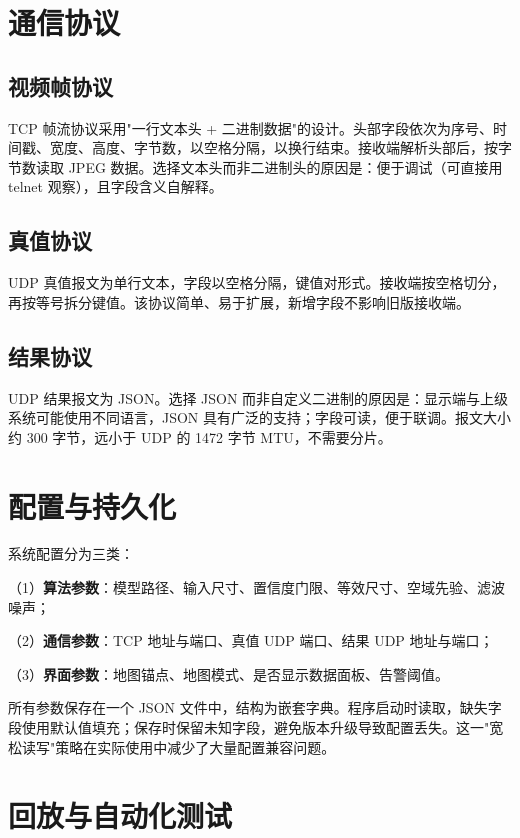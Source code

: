 \section{通信协议}

\subsection{视频帧协议}

TCP 帧流协议采用"一行文本头 + 二进制数据"的设计。头部字段依次为序号、时间戳、宽度、高度、字节数，以空格分隔，以换行结束。接收端解析头部后，按字节数读取 JPEG 数据。选择文本头而非二进制头的原因是：便于调试（可直接用 telnet 观察），且字段含义自解释。

\subsection{真值协议}

UDP 真值报文为单行文本，字段以空格分隔，键值对形式。接收端按空格切分，再按等号拆分键值。该协议简单、易于扩展，新增字段不影响旧版接收端。

\subsection{结果协议}

UDP 结果报文为 JSON。选择 JSON 而非自定义二进制的原因是：显示端与上级系统可能使用不同语言，JSON 具有广泛的支持；字段可读，便于联调。报文大小约 300 字节，远小于 UDP 的 1472 字节 MTU，不需要分片。

\section{配置与持久化}

系统配置分为三类：

（1）\textbf{算法参数}：模型路径、输入尺寸、置信度门限、等效尺寸、空域先验、滤波噪声；

（2）\textbf{通信参数}：TCP 地址与端口、真值 UDP 端口、结果 UDP 地址与端口；

（3）\textbf{界面参数}：地图锚点、地图模式、是否显示数据面板、告警阈值。

所有参数保存在一个 JSON 文件中，结构为嵌套字典。程序启动时读取，缺失字段使用默认值填充；保存时保留未知字段，避免版本升级导致配置丢失。这一"宽松读写"策略在实际使用中减少了大量配置兼容问题。

\section{回放与自动化测试}

